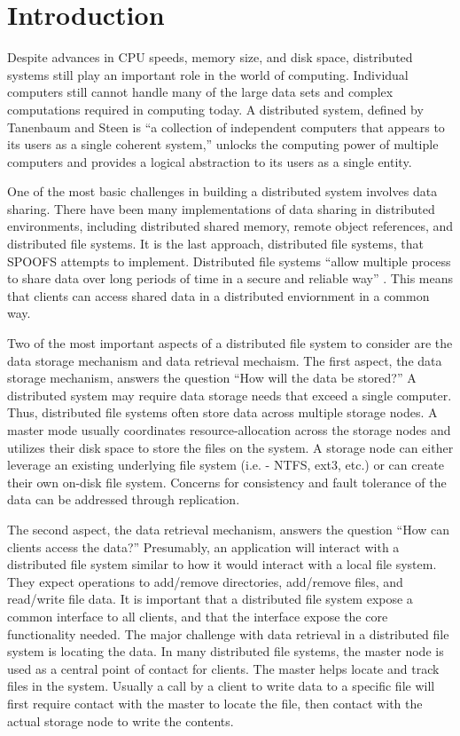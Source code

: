 
\section{Introduction}
\label{sec:introduction}

Despite advances in CPU speeds, memory size, and disk space, distributed systems still play an important role in the world of computing.  Individual computers still cannot handle many of the large data sets and complex computations required in computing today.  A distributed system, defined by Tanenbaum and Steen \cite{tanenbaum_text06} is ``a collection of independent computers that appears to its users as a single coherent system,'' unlocks the computing power of multiple computers and provides a logical abstraction to its users as a single entity.

One of the most basic challenges in building a distributed system involves data sharing.  There have been many implementations of data sharing in distributed environments, including distributed shared memory, remote object references, and distributed file systems.  It is the last approach, distributed file systems, that SPOOFS attempts to implement.  Distributed file systems ``allow multiple process to share data over long periods of time in a secure and reliable way'' \cite{tanenbaum_text06}.  This means that clients can access shared data in a distributed enviornment in a common way.

Two of the most important aspects of a distributed file system to consider are the data storage mechanism and data retrieval mechaism.  The first aspect, the data storage mechanism, answers the question ``How will the data be stored?''  A distributed system may require data storage needs that exceed a single computer.  Thus, distributed file systems often store data across multiple storage nodes.  A master mode usually coordinates resource-allocation across the storage nodes and utilizes their disk space to store the files on the system.  A storage node can either leverage an existing underlying file system (i.e. - NTFS, ext3, etc.) or can create their own on-disk file system.  Concerns for consistency and fault tolerance of the data can be addressed through replication.

The second aspect, the data retrieval mechanism, answers the question ``How can clients access the data?''  Presumably, an application will interact with a distributed file system similar to how it would interact with a local file system.  They expect operations to add/remove directories, add/remove files, and read/write file data.  It is important that a distributed file system expose a common interface to all clients, and that the interface expose the core functionality needed.  The major challenge with data retrieval in a distributed file system is locating the data.  In many distributed file systems, the master node is used as a central point of contact for clients.  The master helps locate and track files in the system.  Usually a call by a client to write data to a specific file will first require contact with the master to locate the file, then contact with the actual storage node to write the contents.

